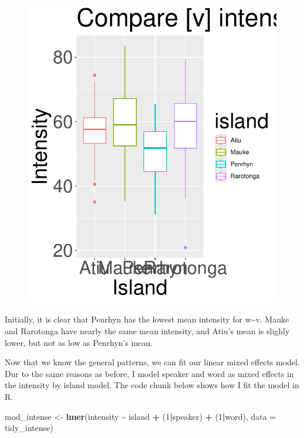\documentclass[
  ,man,floatsintext]{apa6}
\newenvironment{Shaded}{\begin{snugshade}}{\end{snugshade}}
\newcommand{\AttributeTok}[1]{\textcolor[rgb]{0.13,0.29,0.53}{#1}}
\newcommand{\DecValTok}[1]{\textcolor[rgb]{0.00,0.00,0.81}{#1}}
\newcommand{\FunctionTok}[1]{\textcolor[rgb]{0.13,0.29,0.53}{\textbf{#1}}}
\newcommand{\NormalTok}[1]{#1}
\newcommand{\OtherTok}[1]{\textcolor[rgb]{0.56,0.35,0.01}{#1}}
\newcommand{\SpecialCharTok}[1]{\textcolor[rgb]{0.81,0.36,0.00}{\textbf{#1}}}
\begin{document}
\begin{figure}
\includegraphics[width=1500px]{D2_CIM_files/figure-latex/print-intensity-plot-1} \caption{ }\label{fig:print-intensity-plot}
\end{figure}

Initially, it is clear that Penrhyn has the lowest mean intensity for w\textasciitilde v. Mauke and Rarotonga have nearly the same mean intensity, and Atiu's mean is slighly lower, but not as low as Penrhyn's mean.

Now that we know the general patterns, we can fit our linear mixed effects model. Dur to the same reasons as before, I model speaker and word as mixed effects in the intensity by island model. The code chunk below shows how I fit the model in R.

\begin{Shaded}
\begin{Highlighting}[]
\NormalTok{mod\_intense }\OtherTok{\textless{}{-}} \FunctionTok{lmer}\NormalTok{(intensity }\SpecialCharTok{\textasciitilde{}}\NormalTok{ island }\SpecialCharTok{+}\NormalTok{ (}\DecValTok{1}\SpecialCharTok{|}\NormalTok{speaker) }\SpecialCharTok{+}\NormalTok{ (}\DecValTok{1}\SpecialCharTok{|}\NormalTok{word), }\AttributeTok{data =}\NormalTok{ tidy\_intense)}
\end{Highlighting}
\end{Shaded}
\end{document}
